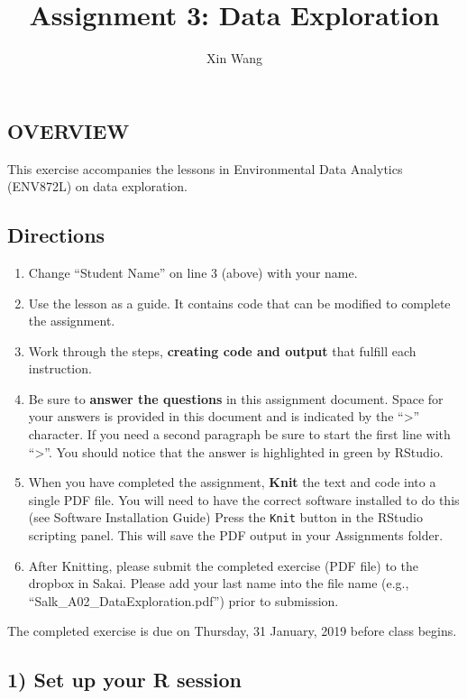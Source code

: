 \documentclass[]{article}
\title{Assignment 3: Data Exploration}
\author{Xin Wang}
\date{}
\providecommand{\tightlist}{%
  \setlength{\itemsep}{0pt}\setlength{\parskip}{0pt}}
\begin{document}
\maketitle

\subsection{OVERVIEW}\label{overview}

This exercise accompanies the lessons in Environmental Data Analytics
(ENV872L) on data exploration.

\subsection{Directions}\label{directions}

\begin{enumerate}
\def\labelenumi{\arabic{enumi}.}
\tightlist
\item
  Change ``Student Name'' on line 3 (above) with your name.
\item
  Use the lesson as a guide. It contains code that can be modified to
  complete the assignment.
\item
  Work through the steps, \textbf{creating code and output} that fulfill
  each instruction.
\item
  Be sure to \textbf{answer the questions} in this assignment document.
  Space for your answers is provided in this document and is indicated
  by the ``\textgreater{}'' character. If you need a second paragraph be
  sure to start the first line with ``\textgreater{}''. You should
  notice that the answer is highlighted in green by RStudio.
\item
  When you have completed the assignment, \textbf{Knit} the text and
  code into a single PDF file. You will need to have the correct
  software installed to do this (see Software Installation Guide) Press
  the \texttt{Knit} button in the RStudio scripting panel. This will
  save the PDF output in your Assignments folder.
\item
  After Knitting, please submit the completed exercise (PDF file) to the
  dropbox in Sakai. Please add your last name into the file name (e.g.,
  ``Salk\_A02\_DataExploration.pdf'') prior to submission.
\end{enumerate}

The completed exercise is due on Thursday, 31 January, 2019 before class
begins.

\subsection{1) Set up your R session}\label{set-up-your-r-session}
\end{document}
